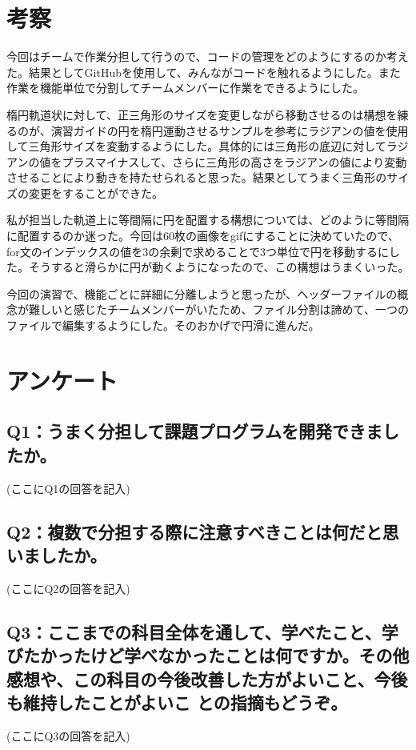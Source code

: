 \documentclass[12pt,a4j]{jarticle}
\begin{document}
\section{考察}

今回はチームで作業分担して行うので、コードの管理をどのようにするのか考えた。結果としてGitHubを使用して、みんながコードを触れるようにした。また作業を機能単位で分割してチームメンバーに作業をできるようにした。

楕円軌道状に対して、正三角形のサイズを変更しながら移動させるのは構想を練るのが、演習ガイドの円を楕円運動させるサンプルを参考にラジアンの値を使用して三角形サイズを変動するようにした。具体的には三角形の底辺に対してラジアンの値をプラスマイナスして、さらに三角形の高さをラジアンの値により変動させることにより動きを持たせられると思った。結果としてうまく三角形のサイズの変更をすることができた。

私が担当した軌道上に等間隔に円を配置する構想については、どのように等間隔に配置するのか迷った。今回は60枚の画像をgifにすることに決めていたので、for文のインデックスの値を3の余剰で求めることで3つ単位で円を移動するにした。そうすると滑らかに円が動くようになったので、この構想はうまくいった。

今回の演習で、機能ごとに詳細に分離しようと思ったが、ヘッダーファイルの概念が難しいと感じたチームメンバーがいたため、ファイル分割は諦めて、一つのファイルで編集するようにした。そのおかげで円滑に進んだ。

\section{アンケート}

\subsection{Q1：うまく分担して課題プログラムを開発できましたか。}

(ここにQ1の回答を記入)

\subsection{Q2：複数で分担する際に注意すべきことは何だと思いましたか。}

(ここにQ2の回答を記入)

\subsection{Q3：ここまでの科目全体を通して、学べたこと、学びたかったけど学べなかったことは何ですか。その他感想や、この科目の今後改善した方がよいこと、今後も維持したことがよいこ との指摘もどうぞ。}

(ここにQ3の回答を記入)
\end{document}
